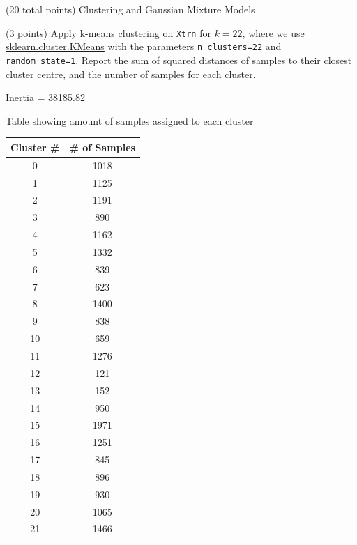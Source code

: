 \documentclass[12pt]{article}
\begin{document}
\begin{question}{(20 total points) Clustering and Gaussian Mixture Models}  


  


  \medskip
   \begin{subquestion}{(3 points)
       Apply k-means clustering on {\tt Xtrn} for $k = 22$, where we use
       \href{https://scikit-learn.org/0.19/modules/generated/sklearn.cluster.KMeans.html}{sklearn.cluster.KMeans}
       with the parameters {\tt n\_clusters=22} and {\tt random\_state=1}.
       Report the sum of squared distances of samples to their closest
       cluster centre, and the number of samples for each cluster.
     } \label{Q3.1}
   

      \begin{answerbox}{35em}
         Inertia = 38185.82
            \begin{center}
    \caption{   Table showing amount of samples assigned to each cluster}\newline
    \begin{tabular}{c|c}
    \hline
    Cluster \# & \# of Samples \\ \hline
    0 & 1018 \\
    1 & 1125  \\
    2 & 1191 \\
    3 & 890 \\
    4 & 1162 \\
    5 & 1332 \\
    6 & 839  \\
    7 & 623 \\
    8 & 1400 \\
    9 & 838 \\
    10 & 659 \\
    11 & 1276 \\
    12 & 121 \\
    13 & 152 \\
    14 & 950 \\
    15 & 1971 \\
    16 & 1251 \\
    17 & 845 \\
    18 & 896 \\
    19 & 930 \\
    20 & 1065 \\
    21 & 1466 \\
    

\end{tabular}
\end{center}
\end{answerbox}
\end{subquestion}
\end{question}
\end{document}
